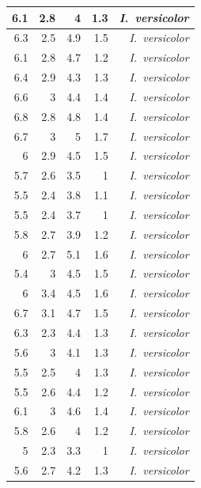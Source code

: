 \begin{enumerate}
\begin{center}
\begin{longtable}{|r|r|r|r|r|}
				6.1   & 2.8   & 4     & 1.3   & \textit{I. versicolor} \\
				\hline
				6.3   & 2.5   & 4.9   & 1.5   & \textit{I. versicolor} \\
				\hline
				6.1   & 2.8   & 4.7   & 1.2   & \textit{I. versicolor} \\
				\hline
				6.4   & 2.9   & 4.3   & 1.3   & \textit{I. versicolor} \\
				\hline
				6.6   & 3     & 4.4   & 1.4   & \textit{I. versicolor} \\
				\hline
				6.8   & 2.8   & 4.8   & 1.4   & \textit{I. versicolor} \\
				\hline
				6.7   & 3     & 5     & 1.7   & \textit{I. versicolor} \\
				\hline
				6     & 2.9   & 4.5   & 1.5   & \textit{I. versicolor} \\
				\hline
				5.7   & 2.6   & 3.5   & 1     & \textit{I. versicolor} \\
				\hline
				5.5   & 2.4   & 3.8   & 1.1   & \textit{I. versicolor} \\
				\hline
				5.5   & 2.4   & 3.7   & 1     & \textit{I. versicolor} \\
				\hline
				5.8   & 2.7   & 3.9   & 1.2   & \textit{I. versicolor} \\
				\hline
				6     & 2.7   & 5.1   & 1.6   & \textit{I. versicolor} \\
				\hline
				5.4   & 3     & 4.5   & 1.5   & \textit{I. versicolor} \\
				\hline
				6     & 3.4   & 4.5   & 1.6   & \textit{I. versicolor} \\
				\hline
				6.7   & 3.1   & 4.7   & 1.5   & \textit{I. versicolor} \\
				\hline
				6.3   & 2.3   & 4.4   & 1.3   & \textit{I. versicolor} \\
				\hline
				5.6   & 3     & 4.1   & 1.3   & \textit{I. versicolor} \\
				\hline
				5.5   & 2.5   & 4     & 1.3   & \textit{I. versicolor} \\
				\hline
				5.5   & 2.6   & 4.4   & 1.2   & \textit{I. versicolor} \\
				\hline
				6.1   & 3     & 4.6   & 1.4   & \textit{I. versicolor} \\
				\hline
				5.8   & 2.6   & 4     & 1.2   & \textit{I. versicolor} \\
				\hline
				5     & 2.3   & 3.3   & 1     & \textit{I. versicolor} \\
				\hline
				5.6   & 2.7   & 4.2   & 1.3   & \textit{I. versicolor} \\

\end{longtable}
\end{center}
\end{enumerate}
